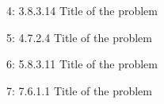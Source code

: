 \documentclass[a4paper,twoside=false,abstract=false,numbers=noenddot,
titlepage=false,headings=small,parskip=half,version=last]{scrartcl}
\begin{document}
\begin{exercise}{4: 3.8.3.14} Title of the problem \\
\end{exercise}
\begin{solution}
\end{solution}
\pagebreak

\begin{exercise}{5: 4.7.2.4} Title of the problem \\
\end{exercise}
\begin{solution}
\end{solution}
\pagebreak

\begin{exercise}{6: 5.8.3.11} Title of the problem \\
\end{exercise}
\begin{solution}
\end{solution}
\pagebreak

\begin{exercise}{7: 7.6.1.1} Title of the problem \\
\end{exercise}
\begin{solution}
\end{solution}
\pagebreak

\end{document}
